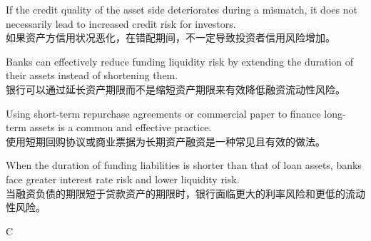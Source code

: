 \documentclass{article}
\begin{document}
            \begin{choices}
                \item If the credit quality of the asset side deteriorates during a mismatch, it does not necessarily lead to increased credit risk for investors.\\
                如果资产方信用状况恶化，在错配期间，不一定导致投资者信用风险增加。
                \item Banks can effectively reduce funding liquidity risk by extending the duration of their assets instead of shortening them.\\
                银行可以通过延长资产期限而不是缩短资产期限来有效降低融资流动性风险。
                \item Using short-term repurchase agreements or commercial paper to finance long-term assets is a common and effective practice.\\
                使用短期回购协议或商业票据为长期资产融资是一种常见且有效的做法。
                \item When the duration of funding liabilities is shorter than that of loan assets, banks face greater interest rate risk and lower liquidity risk.\\
                当融资负债的期限短于贷款资产的期限时，银行面临更大的利率风险和更低的流动性风险。
            \end{choices}
            
            \begin{correctanswer}
                C
            \end{correctanswer}
            
\end{document}
